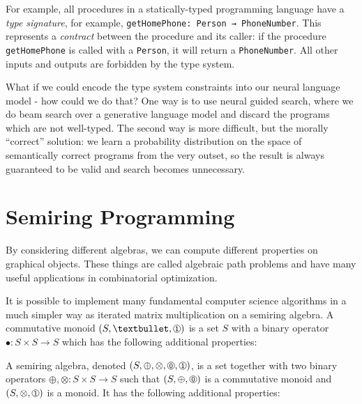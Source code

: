 \documentclass[10pt]{article}
\newcommand*\circled[1]{\tikz[baseline=-0.1cm]{\node[shape=circle,draw,inner sep=0.48pt] (char) {\fontsize{7}{12}\textsf{#1}};}}
\begin{document}
For example, all procedures in a statically-typed programming language have a \textit{type signature}, for example, \texttt{getHomePhone: Person → PhoneNumber}. This represents a \textit{contract} between the procedure and its caller: if the procedure \texttt{getHomePhone} is called with a \texttt{Person}, it will return a \texttt{PhoneNumber}. All other inputs and outputs are forbidden by the type system.

What if we could encode the type system constraints into our neural language model - how could we do that? One way is to use neural guided search, where we do beam search over a generative language model and discard the programs which are not well-typed. The second way is more difficult, but the morally ``correct'' solution: we learn a probability distribution on the space of semantically correct programs from the very outset, so the result is always guaranteed to be valid and search becomes unnecessary.

\pagebreak\section{Semiring Programming}\label{sec:semiring-programming}

By considering different algebras, we can compute different properties on graphical objects. These things are called algebraic path problems and have many useful applications in combinatorial optimization.

It is possible to implement many fundamental computer science algorithms in a much simpler way as iterated matrix multiplication on a semiring algebra. A commutative monoid $(S, •, \circled{1})$ is a set $S$ with a binary operator $•: S \times S → S$ which has the following additional properties:


A semiring algebra, denoted $(S, \oplus, \otimes, \circled{0}, \circled{1})$, is a set together with two binary operators $\oplus, \otimes: S \times S → S$ such that $(S, \oplus, \circled{0})$ is a commutative monoid and $(S, \otimes, \circled{1})$ is a monoid. It has the following additional properties:
\end{document}
